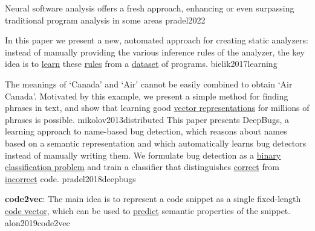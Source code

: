 \documentclass{article}
\begin{document}


  {Neural software analysis offers a fresh approach, enhancing or even surpassing traditional program analysis in some areas}
  {pradel2022}

  {In this paper we present a new, automated approach for creating static analyzers: instead of manually providing the various inference rules of the analyzer, the key idea is to \ul{learn} these \ul{rules} from a \ul{dataset} of programs.}
  {bielik2017learning}

  {The meanings of `Canada' and `Air' cannot be easily combined to obtain `Air Canada'. Motivated by this example, we present a simple method for finding phrases in text, and show that learning good \ul{vector representations} for millions of phrases is possible.}
  {mikolov2013distributed}
  {This paper presents DeepBugs, a learning approach to name-based bug detection, which reasons about names based on a semantic representation and which automatically learns bug detectors instead of manually writing them. We formulate bug detection as a \ul{binary classification problem} and train a classifier that distinguishes \ul{correct} from \ul{incorrect} code.}
  {pradel2018deepbugs}

  {\textbf{code2vec}: The main idea is to represent a code snippet as a single fixed-length \ul{code vector}, which can be used to \ul{predict} semantic properties of the snippet.}
  {alon2019code2vec}
\end{document}
